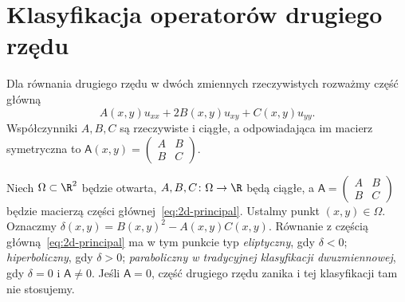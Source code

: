 \section{Klasyfikacja operatorów drugiego rzędu}
\label{sec:pde-classification}

Dla równania drugiego rzędu w dwóch zmiennych rzeczywistych
rozważmy część główną
\begin{equation}\label{eq:2d-principal}
 A(x,y)u_{xx}+2B(x,y)u_{xy}+C(x,y)u_{yy}.
\end{equation}
Współczynniki $A,B,C$ są rzeczywiste i ciągłe, a odpowiadająca
im macierz symetryczna to
$\mathsf A(x,y)=\begin{pmatrix}A&B\\B&C\end{pmatrix}$.

\begin{definicja}
Niech $\Omega\subset\R^2$ będzie otwarta, $A,B,C\colon\Omega\to\R$
będą ciągłe, a $\mathsf A=\begin{pmatrix}A&B\\B&C\end{pmatrix}$
będzie macierzą części głównej~\eqref{eq:2d-principal}.
Ustalmy punkt $(x,y)\in\Omega$.
Oznaczmy $\delta(x,y)=B(x,y)^2-A(x,y)C(x,y)$.
Równanie z częścią główną~\eqref{eq:2d-principal} ma w tym punkcie
typ \emph{eliptyczny}, gdy $\delta<0$;
\emph{hiperboliczny}, gdy $\delta>0$;
\emph{paraboliczny w tradycyjnej klasyfikacji dwuzmiennowej},
gdy $\delta=0$ i $\mathsf A\ne0$.
Jeśli $\mathsf A=0$, część drugiego rzędu zanika i tej
klasyfikacji tam nie stosujemy.
\end{definicja}

